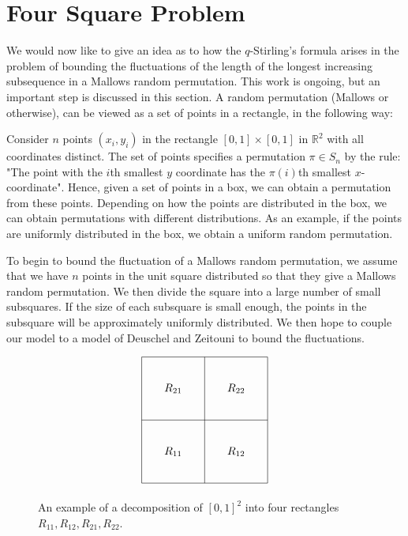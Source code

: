 \documentclass[12pt]{report}
\theoremstyle{definition}
\begin{document}
\section{Four Square Problem}
We would now like to give an idea as to how the $q$-Stirling's formula arises in the problem of bounding the fluctuations of the length of the longest increasing subsequence in a Mallows random permutation.  This work is ongoing, but an important step is discussed in this section.  A random permutation (Mallows or otherwise), can be viewed as a set of points in a rectangle, in the following way:

Consider $n$ points $(x_i, y_i)$ in the rectangle $[0,1]\times [0,1]$ in $\mathbb{R}^2$ with all coordinates distinct.  The set of points specifies a permutation $\pi\in S_n$ by the rule: "The point with the $i$th smallest $y$ coordinate has the $\pi(i)$th smallest $x$-coordinate".  Hence, given a set of points in a box, we can obtain a permutation from these points.  Depending on how the points are distributed in the box, we can obtain permutations with different distributions.  As an example, if the points are uniformly distributed in the box, we obtain a uniform random permutation.  

To begin to bound the fluctuation of a Mallows random permutation, we assume that we have $n$ points in the unit square distributed so that they give a Mallows random permutation.  We then divide the square into a large number of small subsquares.   If the size of each subsquare is small enough, the points in the subsquare will be approximately uniformly distributed.  We then hope to couple our model to a model of Deuschel and Zeitouni \cite{DZ} to bound the fluctuations.  

\begin{figure}
\begin{center}
$$
\begin{tikzpicture}
\draw
(-2,-2)--(-2,2)--(2,2)--(2,-2)--(-2,-2);
\draw
(0,-2)--(0,2);
\draw
(-2,0)--(2,0); 
\node at (-1,-1) {$R_{11}$};
\node at (-1,1) {$R_{21}$};
\node at (1,-1) {$R_{12}$};
\node at (1,1) {$R_{22}$};
\end{tikzpicture}
$$
\caption{An example of a decomposition of $[0,1]^2$ into four rectangles $R_{11}, R_{12}, R_{21}, R_{22}$.}
\label{fig:FourSquare}
\end{center}
\end{figure}
\end{document}
